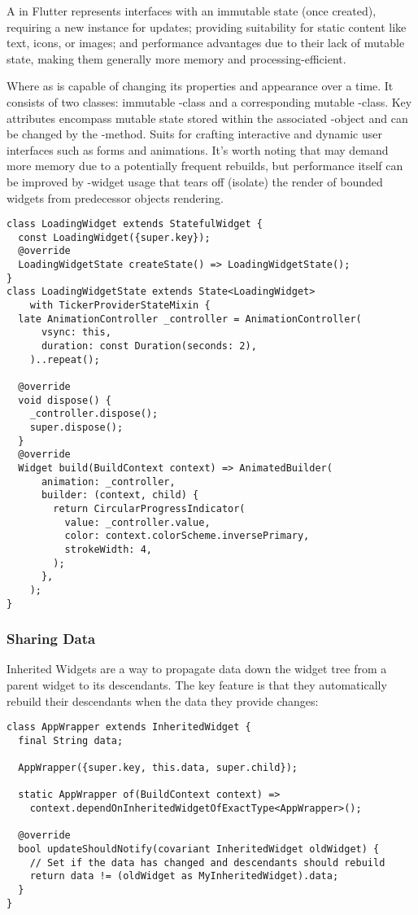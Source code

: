 A  in Flutter represents interfaces with an immutable state (once created), requiring a new instance 
for updates; providing suitability for static content like text, icons, or images; and performance advantages due to 
their lack of mutable state, making them generally more memory and processing-efficient.

Where as  is capable of changing its properties and appearance over a time. It consists of two classes: 
immutable -class and a corresponding mutable -class. Key attributes encompass mutable state stored 
within the associated -object and can be changed by the -method. Suits for crafting interactive 
and dynamic user interfaces such as forms and animations. It's worth noting that  may demand more 
memory due to a potentially frequent rebuilds, but performance itself can be improved by -widget 
usage that tears off (isolate) the render of bounded widgets from predecessor objects rendering.

\begin{lstlisting}
class LoadingWidget extends StatefulWidget {
  const LoadingWidget({super.key});
  @override
  LoadingWidgetState createState() => LoadingWidgetState();
}
class LoadingWidgetState extends State<LoadingWidget> 
    with TickerProviderStateMixin {
  late AnimationController _controller = AnimationController(
      vsync: this,
      duration: const Duration(seconds: 2),
    )..repeat();

  @override
  void dispose() {
    _controller.dispose();
    super.dispose();
  }
  @override
  Widget build(BuildContext context) => AnimatedBuilder(
      animation: _controller,
      builder: (context, child) {
        return CircularProgressIndicator(
          value: _controller.value,
          color: context.colorScheme.inversePrimary,
          strokeWidth: 4,
        );
      },
    );
}
\end{lstlisting}


\subsubsection{Sharing Data}

Inherited Widgets are a way to propagate data down the widget tree from a parent widget to its descendants. The key 
feature is that they automatically rebuild their descendants when the data they provide changes:

\begin{lstlisting}
class AppWrapper extends InheritedWidget {
  final String data;

  AppWrapper({super.key, this.data, super.child});

  static AppWrapper of(BuildContext context) =>
    context.dependOnInheritedWidgetOfExactType<AppWrapper>();

  @override
  bool updateShouldNotify(covariant InheritedWidget oldWidget) {
    // Set if the data has changed and descendants should rebuild
    return data != (oldWidget as MyInheritedWidget).data;
  }
}
\end{lstlisting}

